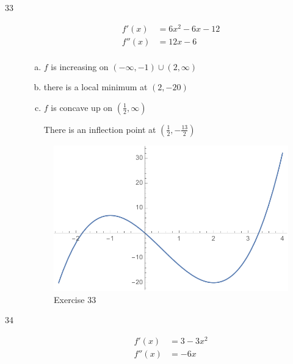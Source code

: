 \documentclass[letterpaper]{exam}
\begin{document}
\begin{description}
    \newpage

    \item[33]
      \begin{align*}
        f'(x)  & = 6x^2 - 6x - 12 \\
        f''(x) & = 12x - 6 \\
      \end{align*}

      \begin{enumerate}[(a)]
        \item $f$ is increasing on $(-\infty, -1) \cup (2, \infty)$

        \item there is a local minimum at $(2, -20)$ 

        \item $f$ is concave up on $\left( \frac{1}{2}, \infty \right)$ 
          
          There is an inflection point at $\left( \frac{1}{2}, - \frac{13}{2} \right)$ 

      \end{enumerate}

      \begin{figure}[H]
        \centering
        \includegraphics[scale = 0.6]{ex33.pdf}
        \caption{Exercise 33}
        \label{fig:ex33}
      \end{figure}

    \newpage

    \item[34]
      \begin{align*}
        f'(x)  & = 3 - 3x^2 \\
        f''(x) & = -6x \\
      \end{align*}


\end{description}
\end{document}
